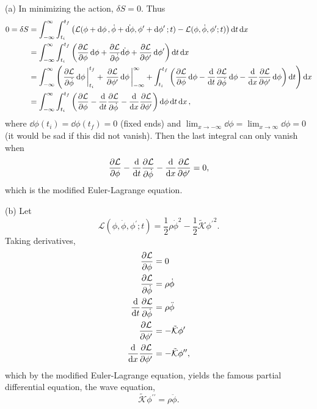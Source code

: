 \documentclass[11pt]{article}
\newcommand{\br}[1]{\left(#1\right)}
\begin{document}
\begin{enumerate}
    (a) In minimizing the action, $\delta S = 0$. Thus \begin{align*}0 = \delta S &= \int_{-\infty}^{\infty}\int_{t_i}^{t_f} \br{\mathcal{L}(\phi+\dd{\phi}, \dot{\phi}+ \dot{\dd{\phi}}, \phi^{\prime}+\dd{\phi}^{\prime}; t)-\mathcal{L}(\phi, \dot{\phi}, \phi^{\prime}; t)}\dd{t}\dd{x} \\
    &= \int_{-\infty}^{\infty}\int_{t_i}^{t_f} \br{\pdv{\mathcal{L}}{\phi}\dd{\phi} + \pdv{\mathcal{L}}{\dot{\phi}}\dot{\dd{\phi}} + \pdv{\mathcal{L}}{\phi^{\prime}}\dd{\phi}^{\prime}}\dd{t}\dd{x} \\
    &= \int_{-\infty}^{\infty} \br{\eval{\pdv{\mathcal{L}}{\dot{\phi}}\dd{\phi}}_{t_i}^{t_f} + \eval{\pdv{\mathcal{L}}{\phi^{\prime}}\dd{\phi}}_{-\infty}^{\infty} + \int_{t_i}^{t_f} \br{\pdv{\mathcal{L}}{\phi}\dd{\phi} - \dv{t}\pdv{\mathcal{L}}{\dot{\phi}}\dd{\phi} - \dv{x}\pdv{\mathcal{L}}{\phi^{\prime}}\dd{\phi}} \dd{t} }\dd{x} \\
    &= \int_{-\infty}^{\infty}\int_{t_i}^{t_f}\br{\pdv{\mathcal{L}}{\phi} - \dv{t}\pdv{\mathcal{L}}{\dot{\phi}} - \dv{x}\pdv{\mathcal{L}}{\phi^{\prime}}} \dd{\phi}\dd{t}\dd{x},\end{align*} where $\dd{\phi}(t_i) = \dd{\phi}(t_f) = 0$ (fixed ends) and $\lim_{x\to -\infty}\dd{\phi} = \lim_{x\to \infty}\dd{\phi} = 0$ (it would be sad if this did not vanish). Then the last integral can only vanish when \[\pdv{\mathcal{L}}{\phi} - \dv{t}\pdv{\mathcal{L}}{\dot{\phi}} - \dv{x}\pdv{\mathcal{L}}{\phi^{\prime}} = 0,\] which is the modified Euler-Lagrange equation.

    (b) Let \[\mathcal{L}(\phi,\dot{\phi}, \phi^{\prime};t) = \frac{1}{2}\rho\dot{\phi}^2 - \frac{1}{2}\tilde{\mathcal{K}}{\phi^{\prime}}^2.\]Taking derivatives, \begin{align*}
        \pdv{\mathcal{L}}{\phi} &= 0\\
        \pdv{\mathcal{L}}{\dot{\phi}} &= \rho\dot{\phi}\\
        \dv{t}\pdv{\mathcal{L}}{\dot{\phi}} &= \rho\ddot{\phi}\\
        \pdv{\mathcal{L}}{\phi^{\prime}} &= -\tilde{\mathcal{K}}\phi^{\prime}\\
        \dv{x}\pdv{\mathcal{L}}{\phi^{\prime}} &= -\tilde{\mathcal{K}}\phi^{\prime \prime},
    \end{align*} which by the modified Euler-Lagrange equation, yields the famous partial differential equation, the wave equation, \[\tilde{\mathcal{K}}\phi^{\prime \prime} = \rho\ddot{\phi}.\]
\end{enumerate}
\end{document}
